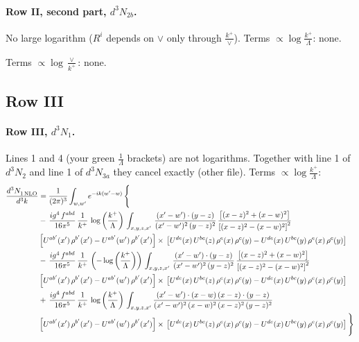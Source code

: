 \documentclass[10pt]{article}
\numberwithin{equation}{section}
\begin{document}
\paragraph{Row II, second part, $d^3N_{2b}$.}
No large logarithm ($R^i$ depends on $\vee$ only through $\frac{k^+}{\vee}$).
\noindent Terms $\propto\log\frac{k^+}{\Lambda}$: none.

\noindent Terms $\propto\log\frac{\vee}{k^+}$: none.

\subsection{Row III}
\paragraph{Row III, $d^3N_1$.}
Lines 1 and 4 (your green $\frac{1}{\Lambda}$ brackets) are not logarithms. Together with line 1 of $d^3N_2$ and line 1 of $d^3N_{3a}$ they cancel exactly (other file).
\noindent Terms $\propto\log\frac{k^+}{\Lambda}$:
\begin{align}
   \frac{d^{3}N_{1\,\rm NLO}^{\rm}}{d^{3}k}  & =  \frac{1}{(2\pi)^{3}}  \int_{w, w^\prime} e^{-ik(w^\prime-w)}\, \Bigg\{\notag \\
& -\,\frac{ig^{4}\,f^{abd}}{16\pi^{5}}\,\frac{1}{k^{+}}\,\log{\left(\frac{k^{+}}{\Lambda}\right)}\,\int_{x,y,z,x'}\, \frac{(x'-w')\cdot (y-z)}{(x'-w')^{2}\,(y-z)^{2}}\,\frac{\left[(x-z)^{2}+(x-w)^{2}\right]}{\left[(x-z)^{2}-(x-w)^{2}\right]^{2}}\notag \\ & \left[U^{ab'}(x')\,\rho^{b'}(x')-U^{ab'}(w')\, \rho^{b'}(x')\right]\times\, \left[U^{de}(x)\,U^{bc}(z)\, \rho^{e}(x)\,\rho^{c}(y)-U^{de}(x)\,U^{bc}(y)\,\rho^{e}(x)\,\rho^{c}(y)\right] \notag \\
& -\,\frac{ig^{4}\,f^{abd}}{16\pi^{5}}\,\frac{1}{k^{+}}\,\left(-\log{\left(\frac{k^{+}}{\Lambda}\right)}\right)\,\int_{x,y,z,x'}\, \frac{(x'-w')\cdot (y-z)}{(x'-w')^{2}\,(y-z)^{2}}\,\frac{\left[(x-z)^{2}+(x-w)^{2}\right]}{\left[(x-z)^{2}-(x-w)^{2}\right]^{2}}\notag \\ & \left[U^{ab'}(x')\,\rho^{b'}(x')-U^{ab'}(w')\, \rho^{b'}(x')\right]\times\, \left[U^{de}(x)\,U^{bc}(z)\, \rho^{e}(x)\,\rho^{c}(y)-U^{de}(x)\,U^{bc}(y)\,\rho^{e}(x)\,\rho^{c}(y)\right] \notag \\
& +\, \frac{ig^{4}\,f^{abd}}{16\pi^{5}}\,\frac{1}{k^{+}}\,\log{\left(\frac{k^{+}}{\Lambda}\right)}\,\int_{x,y,z,x'} \frac{(x'-w')\cdot (x-w)\, (x-z)\cdot (y-z)}{(x'-w')^{2}\, (x-w)^{2}\, (x-z)^{2}\, (y-z)^{2}}\, \notag \\ & \left[U^{ab'}(x')\,\rho^{b'}(x')-U^{ab'}(w')\, \rho^{b'}(x')\right]\times\, \left[U^{de}(x)\,U^{bc}(z)\, \rho^{e}(x)\,\rho^{c}(y)-U^{de}(x)\,U^{bc}(y)\,\rho^{e}(x)\,\rho^{c}(y)\right]\Bigg\} \label{eq:J:G1IIIN1}
\end{align}
\end{document}
